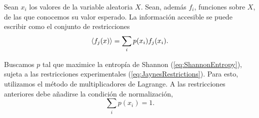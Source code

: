 
Sean $x_{i}$ los valores de la variable aleatoria $X$. Sean, además $f_{i}$, funciones sobre $X$, de las que conocemos su valor esperado. La información accesible se puede escribir como el conjunto de restricciones
\begin{equation}\label{eq:JaynesRestrictions}
    \expval{f_{j}(x)}=\sum_{i}p(x_{i})f_{j}(x_{i}).
\end{equation}


Buscamos $p$ tal que maximice la entropía de Shannon (\ref{eq:ShannonEntropy}), sujeta a las restricciones experimentales (\ref{eq:JaynesRestrictions}). Para esto, utilizamos el método de multiplicadores de Lagrange. A las restricciones anteriores debe añadirse la condición de normalización,
\begin{equation}\label{eq:NormalizationRestriction}
    \sum_{i}p(x_{i})=1.
\end{equation}

